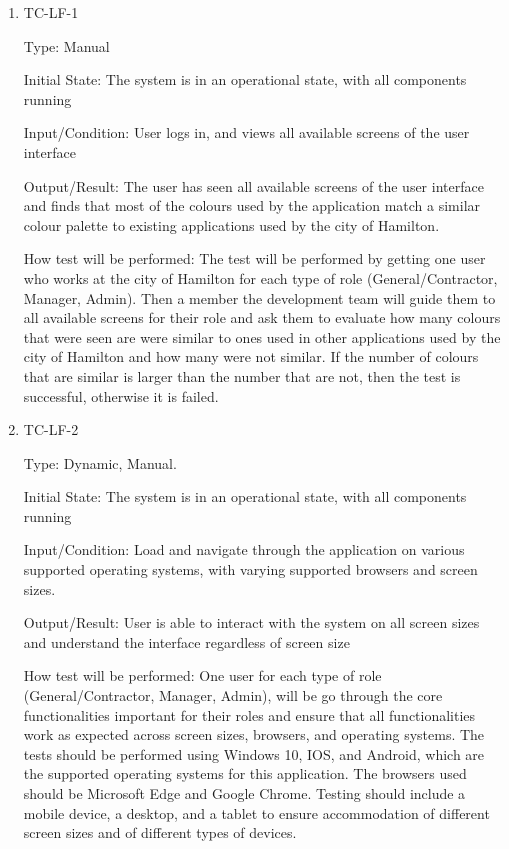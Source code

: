 \documentclass[12pt, titlepage]{article}
\begin{document}
\begin{enumerate}

  \item{TC-LF-1\\}

    Type: Manual

    Initial State: The system is in an operational state, with all
    components running

    Input/Condition: User logs in, and views all available screens of
    the user interface

    Output/Result: The user has seen all available screens of the
    user interface and finds that most of the colours used by the
    application match a similar colour palette to existing
    applications used by the city of Hamilton.

    How test will be performed: The test will be performed by getting
    one user who works at the city of Hamilton for each type of role
    (General/Contractor, Manager, Admin). Then a member the
    development team will guide them to all available screens for their role and
    ask them to evaluate how many colours that were seen are were
    similar to ones used in other applications used by the city of
    Hamilton and how many were not similar. If the number of colours
    that are similar is larger than the number that are not, then the
    test is successful, otherwise it is failed.

  \item{TC-LF-2\\}

    Type: Dynamic, Manual.

    Initial State: The system is in an operational state, with all
    components running

    Input/Condition: Load and navigate through the application on
    various supported operating systems, with varying supported
    browsers and screen sizes.

    Output/Result: User is able to interact with the system on all screen
    sizes and understand the interface regardless of screen size

    How test will be performed: One user for each type of role
    (General/Contractor, Manager, Admin), will be go through the core
    functionalities important for their roles and ensure that all
    functionalities work as expected across screen sizes, browsers,
    and operating systems. The tests should be performed using
    Windows 10, IOS, and Android, which are the supported operating
    systems for this application. The browsers used should be
    Microsoft Edge and Google Chrome. Testing should include a mobile
    device, a desktop, and a tablet to ensure accommodation of
    different screen sizes and of different types of devices.


\end{enumerate}
\end{document}
